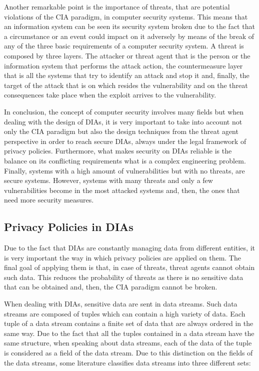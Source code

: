 Another remarkable point is the importance of threats, that are potential violations of the CIA paradigm, in computer security systems. This means that an information system can be seen its security system broken due to the fact that a circumstance or an event could impact on it adversely by means of the break of any of the three basic requirements of a computer security system. A threat is composed by three layers. The attacker or threat agent that is the person or the information system that performs the attack action, the countermeasure layer that is all the systems that try to identify an attack and stop it and, finally, the target of the attack that is on which resides the vulnerability and on the threat consequences take place when the exploit arrives to the vulnerability.

In conclusion, the concept of computer security involves many fields but when dealing with the design of DIAs, it is very important to take into account not only the CIA paradigm but also the design techniques from the threat agent perspective in order to reach secure DIAs, always under the legal framework of privacy policies. Furthermore, what makes security on DIAs reliable is the balance on its conflicting requirements what is a complex engineering problem. Finally, systems with a high amount of vulnerabilities but with no threats, are secure systems. However, systems with many threats and only a few vulnerabilities become in the most attacked systems and, then, the ones that need more security measures.

\subsection{Privacy Policies in DIAs}

Due to the fact that DIAs are constantly managing data from different entities, it is very important the way in which privacy policies are applied on them. The final goal of applying them is that, in case of threats, threat agents cannot obtain such data. This reduces the probability of threats as there is no sensitive data that can be obtained and, then, the CIA paradigm cannot be broken.

When dealing with DIAs, sensitive data are sent in data streams. Such data streams are composed of tuples which can contain a high variety of data. Each tuple of a data stream contains a finite set of data that are always ordered in the same way. Due to the fact that all the tuples contained in a data stream have the same structure, when speaking about data streams, each of the data of the tuple is considered as a field of the data stream. Due to this distinction on the fields of the data streams, some literature \cite{privacypoliciesarticle} classifies data streams into three different sets:

